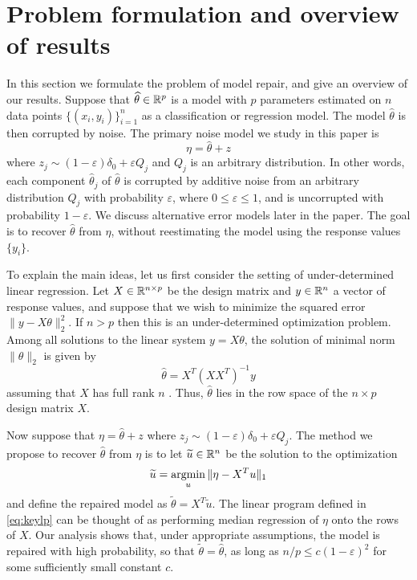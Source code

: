 \let\epsilon\varepsilon
\def\point#1{\vskip10pt\noindent{\it\bfseries #1.}\enspace}
\def\L{{\mathcal L}}

\section{Problem formulation and overview of results}
\label{sec:overview}

In this section we formulate the problem of model repair, and give an overview of our results. Suppose that $\widehat\theta \in \mathbb{R}^p$ is a model with $p$ parameters estimated on $n$ data points $\{(x_i, y_i)\}_{i=1}^n$ as a classification or regression model. The model $\hat\theta$ is then corrupted by noise. The primary noise model we study in this paper is
\begin{equation}
  \eta = \hat\theta + z
\end{equation}
where $z_j \sim (1-\epsilon) \delta_0 + \epsilon Q_j$ and $Q_j$ is an arbitrary distribution. In other words, each component $\hat\theta_j$ of $\hat\theta$ is corrupted by additive noise from an arbitrary distribution $Q_j$ with probability $\epsilon$, where $0\leq \epsilon \leq 1$, and is uncorrupted with probability $1-\epsilon$. We discuss alternative error models later in the paper. The goal is to recover $\hat\theta$ from $\eta$, without reestimating the model using the response values $\{y_i\}$.

\point{Overparameterized linear models}
To explain the main ideas, let us first consider the setting of under-determined linear regression. Let $X\in\mathbb{R}^{n\times p}$ be the design matrix and $y\in\mathbb{R}^n$ a vector of response values, and suppose that we wish to minimize the squared error  $\|y-X\theta\|_2^2$. If $n > p$ then this is an under-determined optimization problem. Among all solutions to the linear system $y = X\theta$, the solution of minimal norm $\|\theta\|_2$ is given by
\begin{equation}
  \hat \theta = X^T (X X^T)^{-1} y \label{eq:min-norm-solution}
\end{equation}
assuming that $X$ has full rank $n$ \citep{boyd:04}. Thus, $\hat\theta$ lies in the row space of the $n\times p$ design matrix $X$.

Now suppose that $\eta = \hat\theta + z$ where $z_j \sim (1-\epsilon) \delta_0 + \epsilon Q_j$. The method we propose to recover $\hat\theta$ from $\eta$ is to let $\widetilde u\in\mathbb{R}^n$ be the solution to the optimization
\begin{equation}
  \tilde u = \argmin_u \| \eta  - X^T u\|_1
  \label{eq:keylp}
\end{equation}
and define the repaired model as $\tilde\theta = X^T\tilde u$.
The linear program defined in \eqref{eq:keylp} can be thought of as performing median regression of $\eta$ onto the rows of $X$.
Our analysis shows that, under appropriate assumptions, the model is repaired with high probability, so that $\tilde \theta = \hat\theta$, as long as $n/p \leq c(1-\epsilon)^2$ for some sufficiently small constant $c$.

